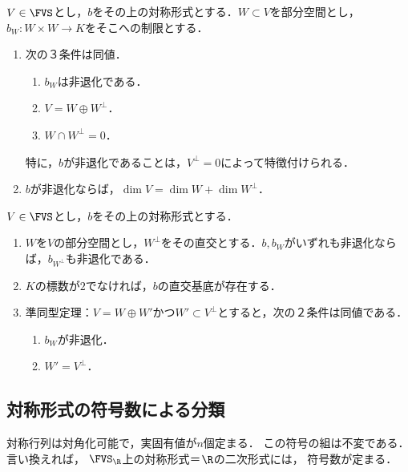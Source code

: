\documentclass[uplatex, dvipdfmx]{jsreport}
\begin{document}
\begin{lemma}[直交が補空間を与えることは非退化であることに同値]\label{prop-decomposition-along-orthogonal-space}
    $V\in\FVS$とし，$b$をその上の対称形式とする．$W\subset V$を部分空間とし，$b_W:W\times W\to K$をそこへの制限とする．
    \begin{enumerate}
        \item 次の３条件は同値．
        \begin{enumerate}[(1)]
            \item $b_W$は非退化である．
            \item $V=W\oplus W^\perp$．
            \item $W\cap W^\perp=0$．
        \end{enumerate}
        特に，$b$が非退化であることは，$V^\perp=0$によって特徴付けられる．
        \item $b$が非退化ならば，$\dim V=\dim W+\dim W^\perp$．
    \end{enumerate}
\end{lemma}

\begin{corollary}[正規直交基底の存在]\label{cor-existence-of-orthogonal-basis}
    $V\in\FVS$とし，$b$をその上の対称形式とする．
    \begin{enumerate}
        \item $W$を$V$の部分空間とし，$W^\perp$をその直交とする．$b,b_W$がいずれも非退化ならば，$b_{W^\perp}$も非退化である．
        \item $K$の標数が$2$でなければ，$b$の直交基底が存在する．
        \item 準同型定理：$V=W\oplus W'$かつ$W'\subset V^\perp$とすると，次の２条件は同値である．
        \begin{enumerate}[(1)]
            \item $b_W$が非退化．
            \item $W'=V^\perp$．
        \end{enumerate}
    \end{enumerate}
\end{corollary}

\subsection{対称形式の符号数による分類}

\begin{tcolorbox}[colframe=ForestGreen, colback=ForestGreen!10!white, breakable]
    対称行列は対角化可能で，実固有値が$n$個定まる．
    この符号の組は不変である．言い換えれば，
    $\FVS_\R$上の対称形式＝$\R$の二次形式には，
    符号数が定まる．
\end{tcolorbox}
\end{document}
